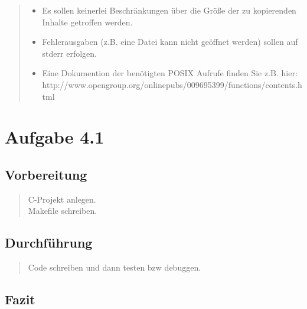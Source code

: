 \begin{quote}
\begin{itemize}
			\item Es sollen keinerlei Beschr\"ankungen \"uber die Gr\"oße der zu kopierenden Inhalte getroffen werden.\\
			\item Fehlerausgaben (z.B. eine Datei kann nicht ge\"offnet werden) sollen auf stderr erfolgen.\\
			\item Eine Dokumention der ben\"otigten POSIX Aufrufe finden Sie z.B. hier:\\
			http://www.opengroup.org/onlinepubs/009695399/functions/contents.html\\
		\end{itemize}
	\end{quote}
\newpage
\section{Aufgabe 4.1}
	\subsection{Vorbereitung}
		\begin{quote}
			C-Projekt anlegen.\\
			Makefile schreiben.\\
		\end{quote}
	\subsection{Durchführung}
		\begin{quote}
			Code schreiben und dann testen bzw debuggen.\\
		\end{quote}
	\subsection{Fazit}
		\begin{quote}
			
		\end{quote}